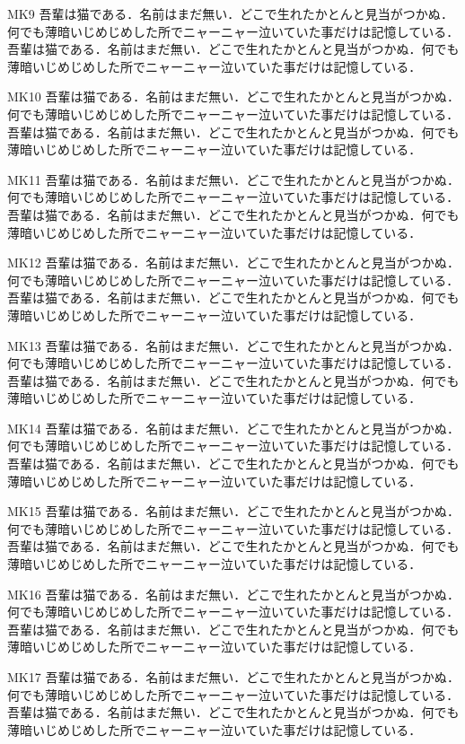 \documentclass[fontsize=10pt,twocolumn]{jlreq}
\begin{document}
MK9 吾輩は猫である．名前はまだ無い．どこで生れたかとんと見当がつかぬ．何でも薄暗いじめじめした所でニャーニャー泣いていた事だけは記憶している． 吾輩は猫である．名前はまだ無い．どこで生れたかとんと見当がつかぬ．何でも薄暗いじめじめした所でニャーニャー泣いていた事だけは記憶している．\par
{}MK10 吾輩は猫である．名前はまだ無い．どこで生れたかとんと見当がつかぬ．何でも薄暗いじめじめした所でニャーニャー泣いていた事だけは記憶している． 吾輩は猫である．名前はまだ無い．どこで生れたかとんと見当がつかぬ．何でも薄暗いじめじめした所でニャーニャー泣いていた事だけは記憶している．\par
{}
MK11 吾輩は猫である．名前はまだ無い．どこで生れたかとんと見当がつかぬ．何でも薄暗いじめじめした所でニャーニャー泣いていた事だけは記憶している． 吾輩は猫である．名前はまだ無い．どこで生れたかとんと見当がつかぬ．何でも薄暗いじめじめした所でニャーニャー泣いていた事だけは記憶している．\par
{}MK12 吾輩は猫である．名前はまだ無い．どこで生れたかとんと見当がつかぬ．何でも薄暗いじめじめした所でニャーニャー泣いていた事だけは記憶している． 吾輩は猫である．名前はまだ無い．どこで生れたかとんと見当がつかぬ．何でも薄暗いじめじめした所でニャーニャー泣いていた事だけは記憶している．\par
{}
MK13 吾輩は猫である．名前はまだ無い．どこで生れたかとんと見当がつかぬ．何でも薄暗いじめじめした所でニャーニャー泣いていた事だけは記憶している． 吾輩は猫である．名前はまだ無い．どこで生れたかとんと見当がつかぬ．何でも薄暗いじめじめした所でニャーニャー泣いていた事だけは記憶している．\par
{}MK14 吾輩は猫である．名前はまだ無い．どこで生れたかとんと見当がつかぬ．何でも薄暗いじめじめした所でニャーニャー泣いていた事だけは記憶している． 吾輩は猫である．名前はまだ無い．どこで生れたかとんと見当がつかぬ．何でも薄暗いじめじめした所でニャーニャー泣いていた事だけは記憶している．\par
{}MK15 吾輩は猫である．名前はまだ無い．どこで生れたかとんと見当がつかぬ．何でも薄暗いじめじめした所でニャーニャー泣いていた事だけは記憶している． 吾輩は猫である．名前はまだ無い．どこで生れたかとんと見当がつかぬ．何でも薄暗いじめじめした所でニャーニャー泣いていた事だけは記憶している．\par
{}MK16 吾輩は猫である．名前はまだ無い．どこで生れたかとんと見当がつかぬ．何でも薄暗いじめじめした所でニャーニャー泣いていた事だけは記憶している． 吾輩は猫である．名前はまだ無い．どこで生れたかとんと見当がつかぬ．何でも薄暗いじめじめした所でニャーニャー泣いていた事だけは記憶している．\par
{}MK17 吾輩は猫である．名前はまだ無い．どこで生れたかとんと見当がつかぬ．何でも薄暗いじめじめした所でニャーニャー泣いていた事だけは記憶している． 吾輩は猫である．名前はまだ無い．どこで生れたかとんと見当がつかぬ．何でも薄暗いじめじめした所でニャーニャー泣いていた事だけは記憶している．\par
\end{document}
